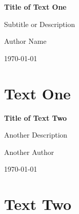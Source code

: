 \documentclass{book}
\newcommand{\customtitle}[3]{
    \begin{titlepage}
        \centering
        \vspace*{1cm}
        \Huge\textbf{#1} %
        \vspace{0.5cm}
        
        \LARGE #2 %
        
        \vfill
        
        \Large #3 %
        
        \vspace{0.8cm}
        
        \Large \today %
    \end{titlepage}
}
\begin{document}
\customtitle{Title of Text One}{Subtitle or Description}{Author Name}
\chapter{Text One}
\lipsum[1-3] %

\customtitle{Title of Text Two}{Another Description}{Another Author}
\chapter{Text Two}
\lipsum[4-6] %
\end{document}
